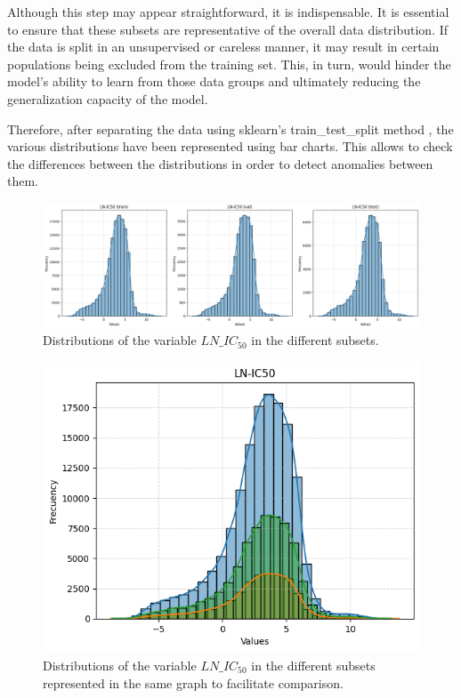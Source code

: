 Although this step may appear straightforward, it is indispensable. It is essential to ensure that these subsets are representative of the overall data distribution. If the data is split in an unsupervised or careless manner, it may result in certain populations being excluded from the training set. This, in turn, would hinder the model's ability to learn from those data groups and ultimately reducing the generalization capacity of the model.

Therefore, after separating the data using sklearn's train\_test\_split method \cite{scikit-learn-train-test-split}, the various distributions have been represented using bar charts. This allows to check the differences between the distributions in order to detect anomalies between them.

\begin{figure}[H]
    \centering
    \includegraphics[width=1\textwidth]{figures/data_representation/LNIC50-splits.png}
    \caption{Distributions of the variable \(LN\_IC_{50}\) in the different subsets.}
    \label{fig:lnic50Split}
\end{figure}

\begin{figure}[H]
    \centering
    \includegraphics[width=1\textwidth]{figures/data_representation/LNIC50-splits-joined.png}
    \caption{Distributions of the variable \(LN\_IC_{50}\) in the different subsets represented in the same graph to facilitate comparison.}
    \label{fig:lnic50SplitJoined}
\end{figure}


